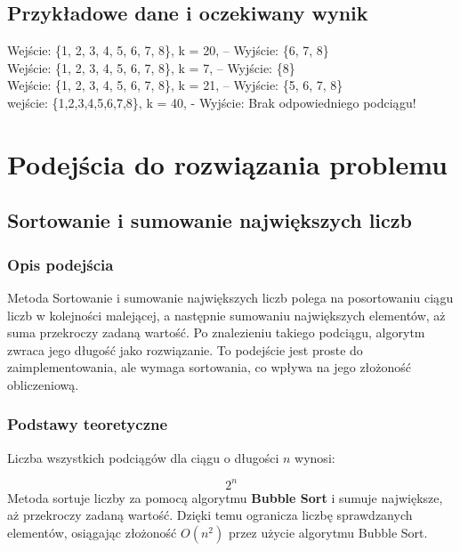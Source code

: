 \documentclass[12pt,twoside]{article}
\begin{document}
\subsection{Przykładowe dane i oczekiwany wynik}
Wejście: \{1, 2, 3, 4, 5, 6, 7, 8\}, k = 20, – Wyjście: \{6, 7, 8\}\\
Wejście: \{1, 2, 3, 4, 5, 6, 7, 8\}, k = 7, – Wyjście: \{8\}\\
Wejście: \{1, 2, 3, 4, 5, 6, 7, 8\}, k = 21, – Wyjście: \{5, 6, 7, 8\}\\
wejście: \{1,2,3,4,5,6,7,8\}, k = 40, - Wyjście: Brak odpowiedniego podciągu!

\section{Podejścia do rozwiązania problemu}

\subsection{Sortowanie i sumowanie największych liczb}

\subsubsection{Opis podejścia}
Metoda Sortowanie i sumowanie największych liczb polega na posortowaniu ciągu liczb w kolejności malejącej, a następnie sumowaniu największych elementów, aż suma przekroczy zadaną wartość. Po znalezieniu takiego podciągu, algorytm zwraca jego długość jako rozwiązanie. To podejście jest proste do zaimplementowania, ale wymaga sortowania, co wpływa na jego złożoność obliczeniową.

\subsubsection{Podstawy teoretyczne}
Liczba wszystkich podciągów dla ciągu o długości \( n \) wynosi:

\begin{equation}
    2^n
    \label{eq:liczba_podciagow}
\end{equation}
Metoda sortuje liczby za pomocą algorytmu \textbf{Bubble Sort} i sumuje największe, aż przekroczy zadaną wartość. Dzięki temu ogranicza liczbę sprawdzanych elementów, osiągając złożoność \( O(n^2) \) przez użycie algorytmu Bubble Sort.
\end{document}
